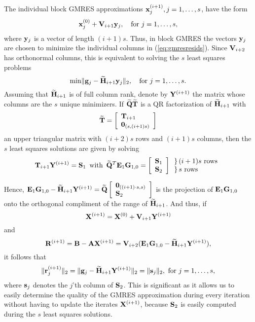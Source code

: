 \documentclass[twoside]{siamltex}
\newcommand{\bA}{{\bf A}}
\newcommand{\bB}{{\bf B}}
\newcommand{\bE}{{\bf E}}
\newcommand{\bG}{{\bf G}}
\newcommand{\bH}{{\bf H}}
\newcommand{\bV}{{\bf V}}
\newcommand{\bQ}{{\bf Q}}
\newcommand{\bR}{{\bf R}}
\newcommand{\bS}{{\bf S}}
\newcommand{\bT}{{\bf T}}
\newcommand{\bX}{{\bf X}}
\newcommand{\bY}{{\bf Y}}
\newcommand{\bx}{{\bf x}}
\newcommand{\by}{{\bf y}}
\newcommand{\br}{{\bf r}}
\newcommand{\bs}{{\bf s}}
\newcommand{\dm}{\begin{displaymath}}
\newcommand{\edm}{\end{displaymath}}
\begin{document}
The individual block GMRES approximations $\bx_j^{(i+1)}, j = 1,
\ldots, s$, have the form
 \dm
 \bx_j^{(0)} + \bV_{i+1} \by_j, \quad {\rm for}~ j = 1, \ldots, s,
 \edm
where $\by_j$ is a vector of length $(i+1)s$. Thus, in block GMRES
the vectors $\by_j$ are chosen to minimize the individual columns
in (\ref{eq:gmresresids}). Since $\bV_{i+2}$ has orthonormal
columns, this is equivalent to solving the $s$ least squares
problems
\begin{equation}
{\rm min}\| {\bf g}_j - \widetilde{\bH}_{i+1} \by_j \|_2, \quad
{\rm for}~ j = 1, \ldots, s.
\end{equation}
Assuming that $\widetilde{\bH}_{i+1}$ is of full column rank,
denote by $\bY^{(i+1)}$ the matrix whose columns are the $s$
unique minimizers. If $\widetilde{\bQ} \widetilde{\bT}$ is a QR
factorization of $\widetilde{\bH}_{i+1} $ with
 \dm
 \widetilde{\bT} =\left[
 \begin{array}{l} \bT_{i+1} \\ {\bf 0}_{(s,(i+1)s)} \end{array}
 \right]
 \edm
an upper triangular matrix with $(i+2)s$ rows and $(i+1)s$
columns, then the $s$ least squares solutions are given by solving
\begin{equation}
\bT_{i+1} \bY^{(i+1)} = \bS_1 \,\,\,\mbox{with} \,\,\,
\widetilde{\bQ}^T \bE_1 \bG_{1,0} = \left[ \begin{array}{c} \bS_1
\\ \bS_2
\end{array} \right] \begin{array}{l} \} \, (i+1)s \mbox{ rows}
\\ \} \, s \mbox{ rows} \end{array}
\end{equation}

Hence, $\bE_1 \bG_{1,0} - \widetilde{\bH}_{i+1} \bY^{(i+1)} =
\widetilde{\bQ} \left[
\begin{array}{l} {\bf 0}_{((i+1) \cdot s, s)} \\ \bS_2 \end{array}
\right] $ is the projection of $\bE_1 \bG_{1,0}$ onto the
orthogonal compliment of the range of $\widetilde{\bH}_{i+1}$. And
thus, if
 \dm
 \bX^{(i+1)} = \bX^{(0)} + \bV_{i+1} \bY^{(i+1)}
 \edm
and
$$\bR^{(i+1)} = \bB - \bA \bX^{(i+1)} = \bV_{i+2}(\bE_1
\bG_{1,0} - \widetilde{\bH}_{i+1} \bY^{(i+1)}),$$ it follows that
\begin{equation}
\| \br_j^{(i+1)} \|_2 = \|{\bf g}_j - \widetilde{\bH}_{i+1}
\bY^{(i+1)} \|_2 = \|\bs_j\|_2, ~{\rm for}~ j = 1,\ldots,s,
\end{equation}
where $\bs_j$ denotes the $j$'th column of $\bS_2$. This is
significant as it allows us to easily determine the quality of the
GMRES approximation during every iteration without having to
update the iterates $\bX^{(i+1)}$, because $\bS_2$ is easily
computed during the $s$ least squares solutions.
\end{document}
